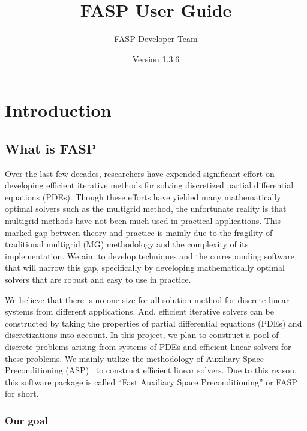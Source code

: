 \documentclass[11pt]{memoir}
\title{\Huge FASP User Guide}
\author{FASP Developer Team}
\date{\vfill Version 1.3.6} %
\begin{document}
\clearpage\maketitle
\thispagestyle{empty}

\newpage
\setcounter{page}{1}
\tableofcontents

\chapter{Introduction}\label{ch:intro}

\section{What is FASP}\label{sec:goal}

Over the last few decades, researchers have expended significant effort on developing efficient iterative methods for solving discretized partial differential equations (PDEs). Though these efforts have yielded many mathematically optimal solvers such as the multigrid method, the unfortunate reality is that multigrid methods have not been much used in practical applications. This marked gap between theory and practice is mainly due to the fragility of traditional multigrid (MG) methodology and the complexity of its implementation. We aim to develop techniques and the corresponding software that will narrow this gap, specifically by developing mathematically optimal solvers that are robust and easy to use in practice.

We believe that there is no one-size-for-all solution method for discrete linear systems from different applications. And, efficient iterative solvers can be constructed by taking the properties of partial differential equations (PDEs) and discretizations into account. In this project, we plan to construct a pool of discrete problems arising from systems of PDEs and efficient linear solvers for these problems. We mainly utilize the methodology of Auxiliary Space Preconditioning (ASP)~\cite{Xu.Xu.2010ff} to construct efficient linear solvers. Due to this reason, this software package is called ``Fast Auxiliary Space Preconditioning'' or FASP for short.

\subsection{Our goal}
\end{document}
